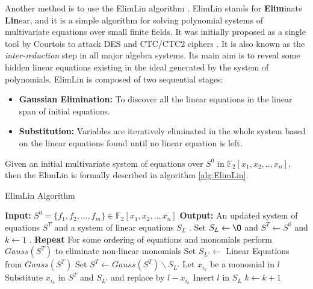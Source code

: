 Another method is to use the ElimLin algorithm \cite{ElimLinR}. ElimLin stands for \textbf{Elim}inate \textbf{Lin}ear, and it is a simple algorithm for solving polynomial systems of multivariate equations over small finite fields. It was initially proposed as a single tool by Courtois to attack DES and CTC/CTC2 ciphers \cite{DEScourtois}. It is also known as the \textit{inter-reduction} step in all major algebra systems. Its main aim is to reveal some hidden linear equations existing in the ideal generated by the system of
polynomials. ElimLin is composed of two sequential stages:

\begin{itemize}
	\item \textbf{Gaussian Elimination:} To discover all the linear equations in the linear span of initial equations.
	\item \textbf{Substitution:} Variables are iteratively eliminated in the whole system based on the linear equations found until no linear equation is left.
\end{itemize}

Given an initial multivariate system of equations over $S^0$ in $\mathbb{F}_2[x_1,x_2,..,x_n]$, then the ElimLin is formally described in algorithm \ref{alg:ElimLin}.

\begin{algorithm} 
	
	\caption{ElimLin Algorithm}
	\begin{algorithmic}\label{alg:ElimLin}
		\STATE \textbf{Input:} $S^0=\{f_1,f_2,...,f_m\} \in \mathbb{F}_2[x_1,x_2,..,x_n]$
		\STATE \textbf{Output:} An updated system of equations $S^T$ and a system of linear equations $S_L$
		. Set $S_L\leftarrow{\O}$ and $S^T \leftarrow S^0$ and $k\leftarrow 1$
		. \textbf{Repeat}
		\STATE For some ordering of equations and monomials perform $Gauss(S^T)$ to eliminate non-linear monomials
		\STATE Set $S_{L'} \leftarrow$ Linear Equations from $Gauss(S^T)$
		\STATE Set $S^T\leftarrow Gauss(S^T)\backslash S_{L'}$
		\STATE Let $x_{i_k}$ be a monomial in $l$
		\STATE Substitute $x_{i_k}$ in $S^T$ and $S_{L'}$ and replace by $l-x_{i_k}$
		\STATE Insert $l$ in $S_L$
		\ENDFOR
		\STATE $k\leftarrow k+1$
	\end{algorithmic}
\end{algorithm}

